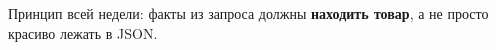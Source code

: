 \documentclass[11pt,a4paper]{article}
\begin{document}
\begin{landscape}
\vspace{5pt}
\begin{center}
{\small\color{inksoft}Принцип всей недели: факты из запроса должны \textbf{находить товар}, а не просто красиво лежать в JSON.}
\end{center}

\end{landscape}
\end{document}
